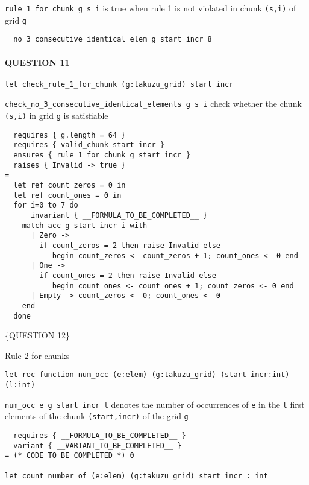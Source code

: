 \texttt{rule\_1\_for\_chunk\ g\ s\ i} is true when rule 1 is not
violated in chunk \texttt{(s,i)} of grid \texttt{g}

\begin{verbatim}
  no_3_consecutive_identical_elem g start incr 8
\end{verbatim}

\hypertarget{question-11}{%
\paragraph{QUESTION 11}\label{question-11}}

\begin{verbatim}
let check_rule_1_for_chunk (g:takuzu_grid) start incr
\end{verbatim}

\texttt{check\_no\_3\_consecutive\_identical\_elements\ g\ s\ i} check
whether the chunk \texttt{(s,i)} in grid \texttt{g} is satisfiable

\begin{verbatim}
  requires { g.length = 64 }
  requires { valid_chunk start incr }
  ensures { rule_1_for_chunk g start incr }
  raises { Invalid -> true }
=
  let ref count_zeros = 0 in
  let ref count_ones = 0 in
  for i=0 to 7 do
      invariant { __FORMULA_TO_BE_COMPLETED__ }
    match acc g start incr i with
      | Zero ->
        if count_zeros = 2 then raise Invalid else
           begin count_zeros <- count_zeros + 1; count_ones <- 0 end
      | One ->
        if count_ones = 2 then raise Invalid else
           begin count_ones <- count_ones + 1; count_zeros <- 0 end
      | Empty -> count_zeros <- 0; count_ones <- 0
    end
  done
\end{verbatim}

\{QUESTION 12\}

Rule 2 for chunks

\begin{verbatim}
let rec function num_occ (e:elem) (g:takuzu_grid) (start incr:int) (l:int)
\end{verbatim}

\texttt{num\_occ\ e\ g\ start\ incr\ l} denotes the number of
occurrences of \texttt{e} in the \texttt{l} first elements of the chunk
\texttt{(start,incr)} of the grid \texttt{g}

\begin{verbatim}
  requires { __FORMULA_TO_BE_COMPLETED__ }
  variant { __VARIANT_TO_BE_COMPLETED__ }
= (* CODE TO BE COMPLETED *) 0

let count_number_of (e:elem) (g:takuzu_grid) start incr : int
\end{verbatim}

